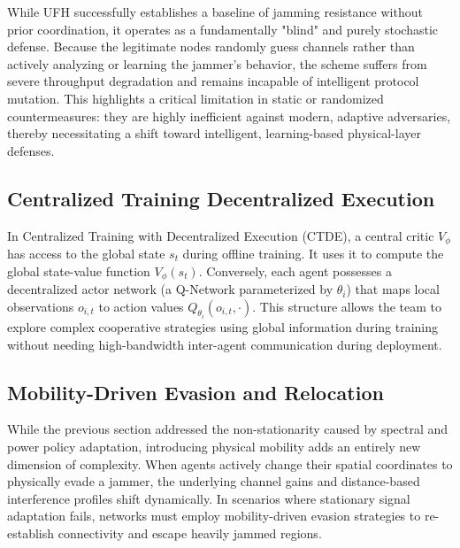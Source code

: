 \documentclass[conference]{IEEEtran}
\newcommand{\adm}[1]{{\color{orange}{[#1]}}}
\newcommand{\rar}[1]{{\color{blue}{[#1]}}}
\begin{document}
While UFH successfully establishes a baseline of jamming resistance without prior coordination, it operates as a fundamentally "blind" and purely stochastic defense.
Because the legitimate nodes randomly guess channels rather than actively analyzing or learning the jammer’s behavior, the scheme suffers from severe throughput degradation and remains incapable of intelligent protocol mutation.
This highlights a critical limitation in static or randomized countermeasures: they are highly inefficient against modern, adaptive adversaries, thereby necessitating a shift toward intelligent, learning-based physical-layer defenses.
\rar{More of anti-jamming, maybe interesting as baseline but not relevant to proposed method}

\subsection{Centralized Training Decentralized Execution } \rar{probably get rid of}
In Centralized Training with Decentralized Execution (CTDE), a central critic $V_{\phi}$ has access to the global state $s_t$ during offline training. 
It uses it to compute the global state-value function $V_{\phi}(s_t)$. 
Conversely, each agent possesses a decentralized actor network (a Q-Network parameterized by $\theta_i$) that maps local observations $o_{i,t}$ to action values $Q_{\theta_i}(o_{i,t},\cdot)$. 
This structure allows the team to explore complex cooperative strategies using global information during training without needing high-bandwidth inter-agent communication during deployment. 

\subsection{Mobility-Driven Evasion and Relocation}
While the previous section addressed the non-stationarity caused by spectral and power policy adaptation, introducing physical mobility adds an entirely new dimension of complexity.
When agents actively change their spatial coordinates to physically evade a jammer, the underlying channel gains and distance-based interference profiles shift dynamically.
In scenarios where stationary signal adaptation fails, networks must employ mobility-driven evasion strategies to re-establish connectivity and escape heavily jammed regions.
\adm{can look at https://ieeexplore.ieee.org/abstract/document/11302544/. it is related because it's cooperative marl for countering jamming, but it's not that related because they're not looking into PHY regulation from either attacker or defenders. the final length of RW section should be around 1 or 1.5 columns (plus a RW table) so we should select those works that are closely relevant to what you propose. This one https://ieeexplore.ieee.org/document/10547296 tries to consider both aspects: what are limitations that can be fixed? In both scenarios it is assumes that mobile nodes's trajectories can be controlled, but it is often not the case (e.g., network of smartphones)}
\end{document}
